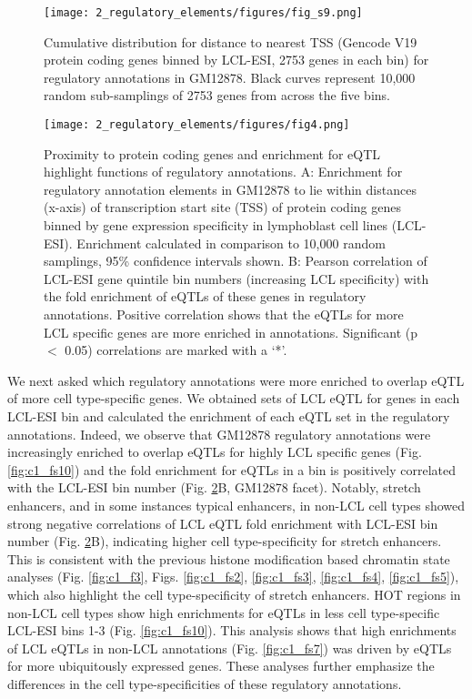 \begin{figure}
    \centering
    \texttt{[image: 2\_regulatory\_elements/figures/fig\_s9.png]}
    \caption[Cumulative distribution for distance to nearest TSS for regulatory annotations in GM12878]{Cumulative distribution for distance to nearest TSS (Gencode V19 protein coding genes binned by LCL-ESI, 2753 genes in each bin) for regulatory annotations in GM12878. Black curves represent 10,000 random sub-samplings of 2753 genes from across the five bins.}
    \label{fig:c1_fs9}
\end{figure}


\begin{figure}
    \centering
    \texttt{[image: 2\_regulatory\_elements/figures/fig4.png]}
    \caption[Proximity to protein coding genes and enrichment for eQTL highlight functions of regulatory annotations]{Proximity to protein coding genes and enrichment for eQTL highlight functions of regulatory annotations. A: Enrichment for regulatory annotation elements in GM12878 to lie within distances (x-axis) of transcription start site (TSS) of protein coding genes binned by gene expression specificity in lymphoblast cell lines (LCL-ESI). Enrichment calculated in comparison to 10,000 random samplings, 95\% confidence intervals shown. B: Pearson correlation of LCL-ESI gene quintile bin numbers (increasing LCL specificity) with the fold enrichment of eQTLs of these genes in regulatory annotations. Positive correlation shows that the eQTLs for more LCL specific genes are more enriched in annotations. Significant (p $<$ 0.05) correlations are marked with a ‘*’.}
    \label{fig:c1_f4}
\end{figure}

We next asked which regulatory annotations were more enriched to overlap eQTL of more cell type-specific genes. We obtained sets of LCL eQTL \cite{gtexconsortiumGeneticEffectsGene2017} for genes in each LCL-ESI bin and calculated the enrichment of each eQTL set in the regulatory annotations. Indeed, we observe that GM12878 regulatory annotations were increasingly enriched to overlap eQTLs for highly LCL specific genes (Fig. \ref{fig:c1_fs10}) and the fold enrichment for eQTLs in a bin is positively correlated with the LCL-ESI bin number (Fig. \ref{fig:c1_f4}B, GM12878 facet). Notably, stretch enhancers, and in some instances typical enhancers, in non-LCL cell types showed strong negative correlations of LCL eQTL fold enrichment with LCL-ESI bin number (Fig. \ref{fig:c1_f4}B), indicating higher cell type-specificity for stretch enhancers. This is consistent with the previous histone modification based chromatin state analyses (Fig. \ref{fig:c1_f3}, Figs. \ref{fig:c1_fs2}, \ref{fig:c1_fs3}, \ref{fig:c1_fs4}, \ref{fig:c1_fs5}), which also highlight the cell type-specificity of stretch enhancers. HOT regions in non-LCL cell types show high enrichments for eQTLs in less cell type-specific LCL-ESI bins 1-3 (Fig. \ref{fig:c1_fs10}). This analysis shows that high enrichments of LCL eQTLs in non-LCL annotations (Fig. \ref{fig:c1_fs7}) was driven by eQTLs for more ubiquitously expressed genes. These analyses further emphasize the differences in the cell type-specificities of these regulatory annotations.\\

